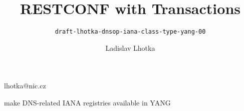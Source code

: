 

\def\prop{{\bf Proposal: }}
\def\opts{{\bf Options:}\numberList}
\let\endOpts=\endNumberList
\def\dstore#1{$\langle\hbox{#1}\rangle$}

\title{RESTCONF with Transactions}
\subtitle{\normalSize\tt draft-lhotka-dnsop-iana-class-type-yang-00}

\author{Ladislav Lhotka}{lhotka@nic.cz}

\date [2018-11-05]

\slide[Objectives]

\bulletList

\item make DNS-related IANA registries available in YANG

\endBulletList

\bye
